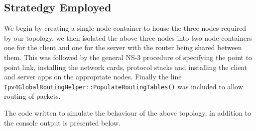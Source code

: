 \documentclass[fullpage]{article}
\begin{document}
\subsection{Stratedgy Employed}
We begin by creating a single node container to house the three nodes required by
our topology, we then isolated the above three nodes into two node containers one
for the client and one for the server with the router being shared between them.
This was followed by the general NS-3 procedure of specifying the point to point link,
installing the network cards, protocol stacks and installing the client and server apps
on the appropriate nodes. Finally the line \verb|Ipv4GlobalRoutingHelper::PopulateRoutingTables()|
was included to allow routing of packets.

The code written to simulate the behaviour of the above topology, in addition to the
console output is presented below.
\end{document}
